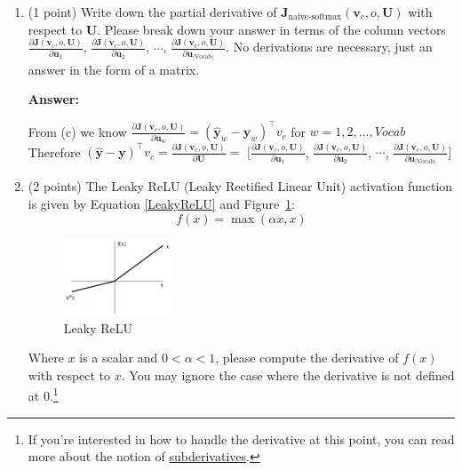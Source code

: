 \documentclass{article}
\newenvironment{answer}{
    {\bf Answer:} \sf \begingroup\color{red}
}{\endgroup}%
\begin{document}
\begin{enumerate}[label=(\alph*)]
\item (1 point) Write down the partial derivative of $\bm J_{\text{naive-softmax}}(\bm v_c, o, \bm U)$ with respect to $\bm U$. Please break down your answer in terms of the column vectors $\frac{\partial \bm J(\bm v_c, o, \bm U)}{\partial \bm u_1}$, $\frac{\partial \bm J(\bm v_c, o, \bm U)}{\partial \bm u_2}$, $\cdots$, $\frac{\partial \bm J(\bm v_c, o, \bm U)}{\partial \bm u_{|\text{Vocab}|}}$. No derivations are necessary, just an answer in the form of a matrix.

\begin{shaded}
\begin{answer}
From (c) we know $\frac{\partial \bm J(\bm v_c, o, \bm U)}{\partial \bm u_w} = (\hat{\bm y}_w - \bm y_w)^\top v_{c}$ for $w = 1,2,...,Vocab$ \\
Therefore $(\hat{\bm y} - \bm y)^\top v_{c} = \frac{\partial \bm J(\bm v_c, o, \bm U)}{\partial \bm U} =$ $[\frac{\partial \bm J(\bm v_c, o, \bm U)}{\partial \bm u_1}$, $\frac{\partial \bm J(\bm v_c, o, \bm U)}{\partial \bm u_2}$, $\cdots$, $\frac{\partial \bm J(\bm v_c, o, \bm U)}{\partial \bm u_{|\text{Vocab}|}}]$
\end{answer}
\end{shaded}

\item (2 points) The Leaky ReLU (Leaky Rectified Linear Unit) activation function is given by Equation \ref{LeakyReLU} and Figure~\ref{fig:leaky_relu}:
\begin{equation}
    \label{LeakyReLU}
    f(x) = \max(\alpha x, x)
\end{equation}

\begin{figure}[h]
    \centering
    \includegraphics[width=0.3\textwidth]{leaky_relu_graph.png}
    \caption{Leaky ReLU}
    \label{fig:leaky_relu}
\end{figure}

Where $x$ is a scalar and $0<\alpha <1$, please compute the derivative of $f(x)$ with respect to $x$. You may ignore the case where the derivative is not defined at 0.\footnote{If you're interested in how to handle the derivative at this point, you can read more about the notion of \hyperref[https://en.wikipedia.org/wiki/Subderivative]{subderivatives}.}


\end{enumerate}
\end{document}
